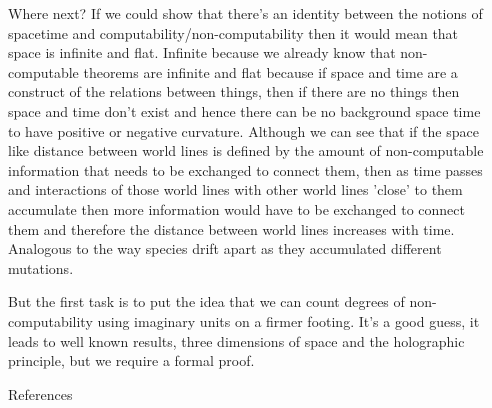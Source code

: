 \documentclass[final]{beamer}
\newlength{\sepwidth}
\newlength{\colwidth}
\newcommand{\separatorcolumn}{\begin{column}{\sepwidth}\end{column}}
\begin{document}
\begin{frame}[t]
\begin{columns}[t]
\begin{column}{\colwidth}
\begin{block}{Where next?}
  If we could show that there's an identity between the notions of spacetime and computability/non-computability then it would mean that space is infinite and flat. Infinite because we already know that non-computable theorems are infinite and flat because if space and time are a construct of the relations between things, then if there are no things then space and time don't exist and hence there can be no background space time to have positive or negative curvature. Although we can see that if the space like distance between world lines is defined by the amount of non-computable information that needs to be exchanged to connect them, then as time passes and interactions of those world lines with other world lines 'close' to them accumulate then more information would have to be exchanged to connect them and therefore the distance between world lines increases with time. Analogous to the way species drift apart as they accumulated different mutations. 

  But the first task is to put the idea that we can count degrees of non-computability using imaginary units on a firmer footing. It's a good guess, it leads to well known results, three dimensions of space and the holographic principle, but we require a formal proof. 
\end{block}

  \begin{block}{References}
    \printbibliography
  \end{block}

\end{column}

\separatorcolumn
\end{columns}
\end{frame}
\end{document}
